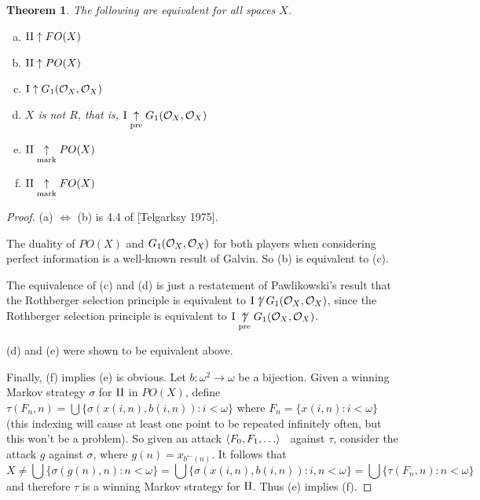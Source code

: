 \documentclass[11pt]{article}
\theoremstyle{plain}
\newtheorem{theorem}{Theorem}
\theoremstyle{definition}
\theoremstyle{remark}
\theoremstyle{plain}
\theoremstyle{definition}
\theoremstyle{remark}
\begin{document}
\begin{theorem}
The following are equivalent for all spaces \(X\).
\begin{enumerate}[a)]
\item \(\mathrm{II}\uparrow FO(X)\)
\item \(\mathrm{II}\uparrow PO(X)\)
\item \(\mathrm{I}\uparrow G_1(\mathcal{O}_{X},\mathcal{O}_{X})\)
\item \(X\) is not \(R\), that is, \(\mathrm{I}\underset{\text{pre}}{\uparrow} G_1(\mathcal{O}_{X},\mathcal{O}_{X})\)
\item \(\mathrm{II}\underset{\text{mark}}{\uparrow} PO(X)\)
\item \(\mathrm{II}\underset{\text{mark}}{\uparrow} FO(X)\)
\end{enumerate}
\end{theorem}
\begin{proof}
(a) \(\Leftrightarrow\) (b) is 4.4 of [Telgarksy 1975].

The duality of \(PO(X)\) and \(G_1(\mathcal{O}_{X},\mathcal{O}_{X})\) for both players
when considering perfect information is a well-known result of Galvin.
So (b) is equivalent to (c).

The equivalence of (c) and (d) is just a restatement of Pawlikowski's
result that the Rothberger selection principle is equivalent
to \(\mathrm{I}\not\uparrow G_1(\mathcal{O}_{X},\mathcal{O}_{X})\), since the Rothberger selection principle
is equivalent to \(\mathrm{I}\underset{\text{pre}}{\not\uparrow}G_1(\mathcal{O}_{X},\mathcal{O}_{X})\).

(d) and (e) were shown to be equivalent above.

Finally, (f) implies (e) is obvious. 
Let \(b:\omega^2\to\omega\) be a bijection.
Given a winning Markov strategy \(\sigma\) for \(\mathrm{II}\) in \(PO(X)\),
define \(\tau(F_n,n)=\bigcup\{\sigma(x(i,n),b(i,n)):i<\omega\}\)
where \(F_n=\{x(i,n):i<\omega\}\) (this indexing will cause at least one 
point to be repeated infinitely often, but this won't be a problem). 
So given an attack \(\<F_0,F_1,\dots\>\) \
against \(\tau\), consider the attack \(g\) against \(\sigma\), 
where \(g(n)=x_{b^{\leftarrow}(n)}\). It follows that
\[
  X
    \not=
  \bigcup\{\sigma(g(n),n):n<\omega\}
    =
  \bigcup\{\sigma(x(i,n),b(i,n)):i,n<\omega\}
    =
  \bigcup\{\tau(F_n,n):n<\omega\}
\]
and therefore \(\tau\) is a winning Markov strategy for \(\mathrm{II}\).
Thus (e) implies (f).
\end{proof}
\end{document}

